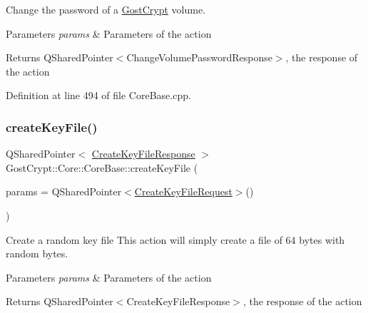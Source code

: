Change the password of a \hyperlink{namespace_gost_crypt}{Gost\+Crypt} volume. 


\begin{DoxyParams}{Parameters}
{\em params} & Parameters of the action \\
\hline
\end{DoxyParams}
\begin{DoxyReturn}{Returns}
Q\+Shared\+Pointer$<$\+Change\+Volume\+Password\+Response$>$, the response of the action 
\end{DoxyReturn}


Definition at line 494 of file Core\+Base.\+cpp.

\mbox{\label{class_gost_crypt_1_1_core_1_1_core_base_a6db58096a7fc5ed13c20dc0b7ca4abdb}} 
\subsubsection{\texorpdfstring{create\+Key\+File()}{createKeyFile()}}
{\footnotesize\ttfamily Q\+Shared\+Pointer$<$ \hyperlink{struct_gost_crypt_1_1_core_1_1_create_key_file_response}{Create\+Key\+File\+Response} $>$ Gost\+Crypt\+::\+Core\+::\+Core\+Base\+::create\+Key\+File (\begin{DoxyParamCaption}\item[{Q\+Shared\+Pointer$<$ \hyperlink{struct_gost_crypt_1_1_core_1_1_create_key_file_request}{Create\+Key\+File\+Request} $>$}]{params = {\ttfamily QSharedPointer$<$\hyperlink{struct_gost_crypt_1_1_core_1_1_create_key_file_request}{Create\+Key\+File\+Request}$>$()} }\end{DoxyParamCaption})\hspace{0.3cm}{\ttfamily [protected]}}



Create a random key file This action will simply create a file of 64 bytes with random bytes. 


\begin{DoxyParams}{Parameters}
{\em params} & Parameters of the action \\
\hline
\end{DoxyParams}
\begin{DoxyReturn}{Returns}
Q\+Shared\+Pointer$<$\+Create\+Key\+File\+Response$>$, the response of the action 
\end{DoxyReturn}


